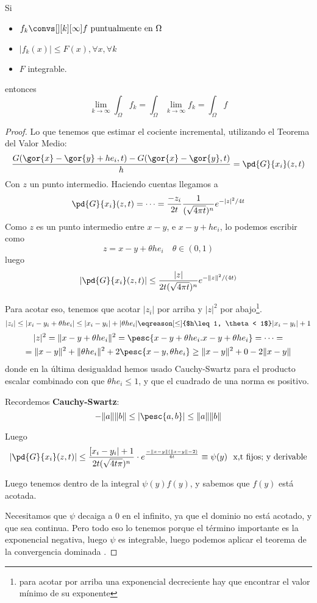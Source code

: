 		\newpage %
		\begin{theorem}
			Si
			\begin{itemize}
				\item $ f_k \convs[ ][k][\infty] f \text{ puntualmente en } \Omega $
				\item $ | f_k (x) | \leq F(x), \forall x, \forall k $
				\item $ F $ integrable.
			\end{itemize}
			entonces
			\[ \lim_{k \to \infty} \int_\Omega f_k = \int_\Omega \lim_{k\to \infty} f_k = \int_\Omega f \]
		\end{theorem}
		\begin{proof}
		Lo que tenemos que estimar el cociente incremental, utilizando el Teorema del Valor Medio:
		\[ \frac{G(\gor{x}-\gor{y}+he_i,t)-G(\gor{x}-\gor{y},t)}{h} = \pd{G}{x_i}(z,t) \]
		Con $z$ un punto intermedio. Haciendo cuentas llegamos a
		\[ \pd{G}{x_i}(z,t) = \dots = \frac{-z_i}{2t} \frac{1}{(\sqrt{4 \pi t}) ^n} e^{-|z|^2 / 4t} \]
		Como $z$ es un punto intermedio entre $x-y$, e $x-y+h e_i$, lo podemos escribir como \[ z = x - y + \theta h e_i \quad \theta \in (0,1) \]
		luego
		\[ \left| \pd{G}{x_i} (z,t) \right| \leq \frac{|z|}{2t (\sqrt{4 \pi t})^n} e^{- \| z \|^2 / (4t)} \]

		Para acotar eso, tenemos que acotar $|z_i|$ por arriba y $|z|^2$ por abajo\footnote{para acotar por arriba una exponencial decreciente hay que encontrar el valor mínimo de su exponente}.
		\[ |z_i| \leq |x_i - y_i + \theta h e_i| \leq |x_i - y_i| + |\theta h e_i| \eqreason[\leq]{$h\leq1, \theta < 1$} |x_i - y_i| + 1 \]
		\begin{gather*}
		|z|^2 = \| x - y + \theta h e_i \|^2 = \pesc{x - y + \theta h e_i. x - y + \theta h e_i} = \dots =\\
		= \| x - y \|^2 + \| \theta h e_i \|^2 + 2 \pesc{x-y, \theta h e_i} \geq \| x - y\|^2 + 0 - 2 \| x - y\|
		\end{gather*}
		donde en la última desigualdad hemos usado Cauchy-Swartz para el producto escalar combinado con que $\theta h e_i \leq 1$, y que el cuadrado de una norma es positivo.

		Recordemos {\bf Cauchy-Swartz}:
		\[ -\|a\| \|b\| \leq |\pesc{a, b}| \leq \|a\| \|b\| \]

		Luego
		\[ \left| \pd{G}{x_i} (z,t) \right| \leq \frac{[x_i - y_i| + 1}{2t (\sqrt{4t \pi})^n} \cdot e^{\frac{-\| x-y \|(\| x-y \| - 2)}{4t} } \equiv \psi(y) \ \text{ x,t fijos; y derivable}\]

		Luego tenemos dentro de la integral $\psi(y) f(y)$, y sabemos que $f(y)$ está acotada.

		Necesitamos que $\psi$ decaiga a 0 en el infinito, ya que el dominio no está acotado, y que sea continua. Pero todo eso lo tenemos porque el término importante es la exponencial negativa, luego $\psi$ es integrable, luego podemos aplicar el teorema de la convergencia dominada .
		\end{proof}

